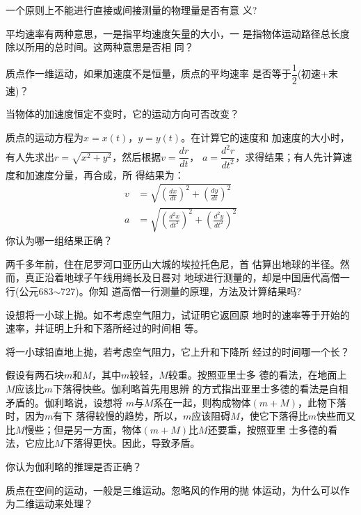 \questions
\fangsong
\question 一个原则上不能进行直接或间接测量的物理量是否有意
义?

\question 平均速率有两种意思，一是指平均速度矢量的大小，一
是指物体运动路径总长度除以所用的总时间。这两种意思是否相
同？

\question 质点作一维运动，如果加速度不是恒量，质点的平均速率
是否等于$\dfrac 1 2$(初速+末速)？

\question 当物体的加速度恒定不变时，它的运动方向可否改变？

\question 质点的运动方程为$x=x(t)$，$y=y(t)$。在计算它的速度和
加速度的大小时，有人先求出$r=\sqrt{x^2+y^2}$，然后根据$v=\dfrac{dr}{dt}$，
$a=\dfrac{d^2r}{dt^2}$，求得结果；有人先计算速度和加速度分量，再合成，所
得结果为：\vspace{-1em}
\begin{equation*}
    \begin{aligned}
        v &=\sqrt{\left(\frac{d x}{d t}\right)^{2}+\left(\frac{d y}{d t}\right)^{2}} \\
        a &=\sqrt{\left(\frac{d^{2} x}{d t^{2}}\right)^{2}+\left(\frac{d^{2} y}{d t^{2}}\right)^{2}}
    \end{aligned}
\end{equation*}
你认为哪一组结果正确？

\question  两千多年前，住在尼罗河口亚历山大城的埃拉托色尼，首
估算出地球的半径。然而，真正沿着地球子午线用绳长及日晷对
地球进行测量的，却是中国唐代高僧一行(公元683$\sim$727)。你知
道高僧一行测量的原理，方法及计算结果吗?

\question  设想将一小球上抛。如不考虑空气阻力，试证明它返回原
地时的速率等于开始的速率，并证明上升和下落所经过的时间相
等。

\question  将一小球铅直地上抛，若考虑空气阻力，它上升和下降所
经过的时间哪一个长？

\question  假设有两石块$m$和$M$，其中$m$较轻，$M$较重。按照亚里士多
德的看法，在地面上$M$应该比$m$下落得快些。伽利略首先用思辨
的方式指出亚里士多德的看法是自相矛盾的。伽利略说，设想将
$m$与$M$系在一起，则构成物体$(m+M)$，此物下落时，因为$m$有下
落得较慢的趋势，所以，$m$应该阻碍$M$，使它下落得比$m$快些而又
比$M$慢些；但是另一方面，物体$(m+M)$比$M$还要重，按照亚里
士多德的看法，它应比$M$下落得更快。因此，导致矛盾。

你认为伽利略的推理是否正确？

\question  质点在空间的运动，一般是三维运动。忽略风的作用的抛
体运动，为什么可以作为二维运动来处理？
\normalfont
